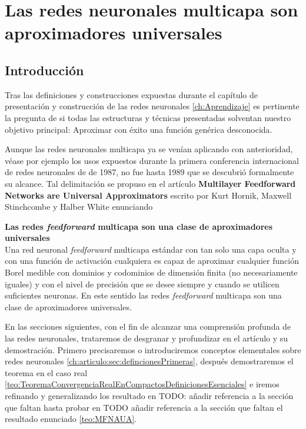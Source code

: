%

\chapter{Las redes neuronales multicapa son aproximadores universales}  

\section{Introducción}  

Tras las definiciones y construcciones expuestas durante el capítulo de presentación 
y construcción de las redes neuronales  \ref{ch:Aprendizaje}
es pertinente la pregunta de si todas las estructuras y técnicas presentadas solventan nuestro 
objetivo principal: Aproximar con éxito una función genérica desconocida.   

Aunque las redes neuronales multicapa ya se venían aplicando con anterioridad, 
véase por ejemplo los usos expuestos durante la primera conferencia
internacional de redes neuronales de \cite{4307059} de 1987, 
no fue hasta 1989 que se descubrió formalmente su alcance.
 Tal delimitación se propuso en el artículo 
\textbf{Multilayer Feedforward Networks are Universal Approximators} \cite{HORNIK1989359}
 escrito por Kurt Hornik, Maxwell Stinchcombe y Halber White enunciando 

\begin{teorema}\textbf{Las redes \textit{feedforward} multicapa son una clase de aproximadores universales } \label{teo:MFNAUA}
    \\
    Una red neuronal \textit{feedforward} multicapa estándar con tan solo una capa oculta y con una función de activación cualquiera es capaz de aproximar cualquier 
    función Borel medible  con dominios y codominios de dimensión finita (no necesariamente iguales) y con el nivel de precisión que se desee siempre y cuando 
    se utilicen suficientes neuronas. En este sentido las redes \textit{feedforward} multicapa son una clase de aproximadores universales.

\end{teorema}

En las secciones siguientes, con el fin de alcanzar una comprensión profunda de las redes neuronales,
trataremos de desgranar y profundizar en el artículo y su demostración. Primero precisaremos o introduciremos conceptos elementales 
sobre redes neuronales \ref{ch:articulo:sec:defincionesPrimeras}, después demostraremos el teorema en el caso real 
\ref{teo:TeoremaConvergenciaRealEnCompactosDefinicionesEsenciales} e iremos refinando y generalizando los resultado 
en 
TODO: añadir referencia a la sección  que faltan 
hasta probar en 
TODO añadir referencia a la sección  que faltan 
el resultado enunciado \ref{teo:MFNAUA}.


